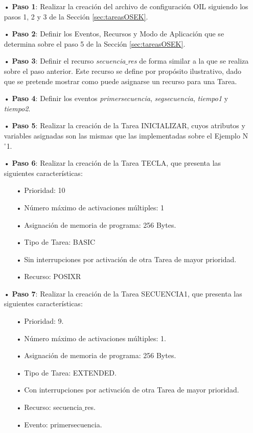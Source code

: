 \documentclass[12pt,letterpaper]{article}
\begin{document}
\begin{enumerate}
\item[•]\textbf{Paso 1}: Realizar la creación del archivo de configuración OIL siguiendo los pasos 1, 2 y 3 de la Sección \ref{sec:tareasOSEK}.
\item[•]\textbf{Paso 2}: Definir los Eventos, Recursos y Modo de Aplicación que se determina sobre el paso 5 de la Sección \ref{sec:tareasOSEK}.
\item[•]\textbf{Paso 3}: Definir el recurso \textit{secuencia$\_$res} de forma similar a la que se realiza sobre el paso anterior. Este recurso se define por propósito ilustrativo, dado que se pretende mostrar como puede asignarse un recurso para una Tarea.
\item[•]\textbf{Paso 4}: Definir los eventos \textit{primersecuencia}, \textit{segsecuencia}, \textit{tiempo1} y \textit{tiempo2}.
\item[•]\textbf{Paso 5}: Realizar la creación de la Tarea INICIALIZAR, cuyos atributos y variables asignadas son las mismas que las implementadas sobre el Ejemplo N$^{\circ}$1.
\item[•]\textbf{Paso 6}: Realizar la creación de la Tarea TECLA, que presenta las siguientes características:
\begin{enumerate}
\item[•]Prioridad: 10
\item[•]Número máximo de activaciones múltiples: 1
\item[•]Asignación de memoria de programa: 256 Bytes.
\item[•]Tipo de Tarea: BASIC
\item[•]Sin interrupciones por activación de otra Tarea de mayor prioridad.
\item[•]Recurso: POSIXR
\end{enumerate}
\item[•]\textbf{Paso 7}: Realizar la creación de la Tarea SECUENCIA1, que presenta las siguientes características:
\begin{enumerate}
\item[•]Prioridad: 9.
\item[•]Número máximo de activaciones múltiples: 1.
\item[•]Asignación de memoria de programa: 256 Bytes.
\item[•]Tipo de Tarea: EXTENDED.
\item[•]Con interrupciones por activación de otra Tarea de mayor prioridad.
\item[•]Recurso: secuencia$\_$res.
\item[•]Evento: primersecuencia.

\end{enumerate}
\end{enumerate}
\end{document}
